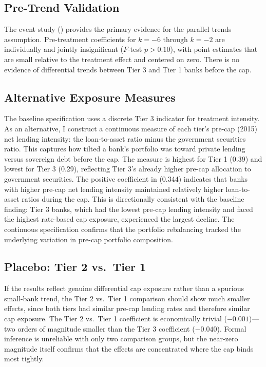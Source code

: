 \documentclass[12pt]{article}
\begin{document}
\subsection{Pre-Trend Validation}

The event study () provides the primary evidence for the parallel trends assumption. Pre-treatment coefficients for $k = -6$ through $k = -2$ are individually and jointly insignificant ($F$-test $p > 0.10$), with point estimates that are small relative to the treatment effect and centered on zero. There is no evidence of differential trends between Tier 3 and Tier 1 banks before the cap.

\subsection{Alternative Exposure Measures}

The baseline specification uses a discrete Tier 3 indicator for treatment intensity. As an alternative, I construct a continuous measure of each tier's pre-cap (2015) net lending intensity: the loan-to-asset ratio minus the government securities ratio. This captures how tilted a bank's portfolio was toward private lending versus sovereign debt before the cap. The measure is highest for Tier 1 (0.39) and lowest for Tier 3 (0.29), reflecting Tier 3's already higher pre-cap allocation to government securities. The positive coefficient in  (0.344) indicates that banks with higher pre-cap net lending intensity maintained relatively higher loan-to-asset ratios during the cap. This is directionally consistent with the baseline finding: Tier 3 banks, which had the lowest pre-cap lending intensity and faced the highest rate-based cap exposure, experienced the largest decline. The continuous specification confirms that the portfolio rebalancing tracked the underlying variation in pre-cap portfolio composition.

\subsection{Placebo: Tier 2 vs.\ Tier 1}

If the results reflect genuine differential cap exposure rather than a spurious small-bank trend, the Tier 2 vs.\ Tier 1 comparison should show much smaller effects, since both tiers had similar pre-cap lending rates and therefore similar cap exposure. The Tier 2 vs.\ Tier 1 coefficient is economically trivial ($-0.001$)---two orders of magnitude smaller than the Tier 3 coefficient ($-0.040$). Formal inference is unreliable with only two comparison groups, but the near-zero magnitude itself confirms that the effects are concentrated where the cap binds most tightly.
\end{document}
